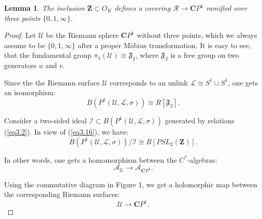 \documentclass[10pt, reqno]{amsart}
\newtheorem{lemma}[theorem]{Lemma}
\theoremstyle{definition}
\theoremstyle{remark}
\numberwithin{equation}{section}
\begin{document}
\begin{lemma}\label{lm3.3}
 The inclusion $\mathbf{Z}\subset O_K$ defines a covering $\mathscr{R}\to \mathbf{C}P^1$
ramified over three  points $\{0,1, \infty\}$.
\end{lemma}
\begin{proof}
Let $\mathscr{U}$ be the Riemann sphere $\mathbf{C}P^1$ without three points,
which we always assume to be $\{0,1,\infty\}$ after a proper M\"obius transformation. 
It is easy to see, that the fundamental group $\pi_1(\mathscr{U})\cong \mathfrak{F}_2$,  where 
 $\mathfrak{F}_2$ is a free group on two generators $u$ and $v$. 
 
 
 Since the the Riemann surface $\mathscr{U}$ corresponds to 
  an unlink $\mathscr{L}\cong S^1\cup S^1$,    one gets an isomorphism:
 \begin{equation}\label{eq3.16}
 B(P^1(\mathscr{U}, \mathcal{L}, \sigma))\cong R[\mathfrak{F}_2].
 \end{equation}



\smallskip
Consider a two-sided ideal $\mathscr{I}\subset  B(P^1(\mathscr{U}, \mathcal{L}, \sigma))$
generated by relations (\ref{eq3.2}). In view of  (\ref{eq3.16}), we have:
 \begin{equation}\label{eq3.17}
 B(P^1(\mathscr{U}, \mathcal{L}, \sigma))/\mathscr{I}\cong R[PSL_2(\mathbf{Z})].
 \end{equation}

\smallskip
In other words, one gets  a homomorphism between the $C^*$-algebras:
 \begin{equation}\label{eq3.18}
 \mathscr{A}_{\mathscr{U}}\to \mathscr{A}_{\mathbf{C}P^1}. 
 \end{equation}

Using the commutative diagram in Figure 1, we get a holomorphic map between 
the corresponding Riemann surfaces:
 \begin{equation}\label{eq3.19}
 \mathscr{U}\to \mathbf{C}P^1.  
 \end{equation}



\end{proof}
\end{document}
